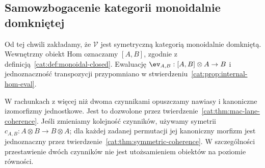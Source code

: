 \subsection{Samowzbogacenie kategorii monoidalnie domkniętej}

Od tej chwili zakładamy, że $\mathcal V$ jest symetryczną kategorią monoidalnie domkniętą. Wewnętrzny obiekt Hom oznaczamy $[A,B]$, zgodnie z definicją~\ref{cat:def:monoidal-closed}. Ewaluację $\ev_{A,B}:[A,B]\otimes A\to B$ i jednoznaczność transpozycji przypomniano w stwierdzeniu~\ref{cat:prop:internal-hom-eval}.

W rachunkach z więcej niż dwoma czynnikami opuszczamy nawiasy i kanoniczne izomorfizmy jednostkowe. Jest to dozwolone przez twierdzenie~\ref{cat:thm:mac-lane-coherence}. Jeśli zmieniamy kolejność czynników, używamy symetrii $c_{A,B}:A\otimes B\to B\otimes A$; dla każdej zadanej permutacji jej kanoniczny morfizm jest jednoznaczny przez twierdzenie~\ref{cat:thm:symmetric-coherence}. W szczególności przestawienie dwóch czynników nie jest utożsamieniem obiektów na poziomie równości.

